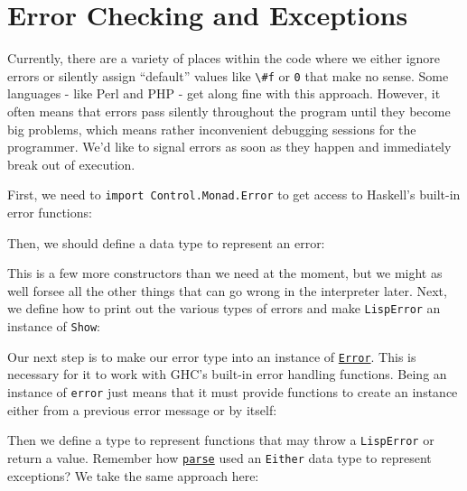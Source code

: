 \chapter{Error Checking and Exceptions}
 
 
Currently, there are a variety of places within the code where we either ignore errors or silently assign ``default'' values like \lstinline|\#f| or \lstinline|0| that make no sense. Some languages - like Perl and PHP - get along fine with this approach. However, it often means that errors pass silently throughout the program until they become big problems, which means rather inconvenient debugging sessions for the programmer. We'd like to signal errors as soon as they happen and immediately break out of execution.
 
First, we need to \lstinline|import Control.Monad.Error| to get access to Haskell's built-in error functions:
 
 
Then, we should define a data type to represent an error:
 
 
This is a few more constructors than we need at the moment, but we might as well forsee all the other things that can go wrong in the interpreter later. Next, we define how to print out the various types of errors and make \verb|LispError| an instance of \verb|Show|:
 
 
Our next step is to make our error type into an instance of \href{http://www.haskell.org/ghc/docs/latest/html/libraries/mtl/Control-Monad-Error.html}{\texttt{Error}}. This is necessary for it to work with GHC's built-in error handling functions. Being an instance of \verb|error| just means that it must provide functions to create an instance either from a previous error message or by itself:
 
 
Then we define a type to represent functions that may throw a \verb|LispError| or return a value. Remember how \href{http://www.cs.uu.nl/~daan/download/parsec/parsec.html\#parse}{\texttt{parse}} used an \verb|Either| data type to represent exceptions? We take the same approach here:
 
